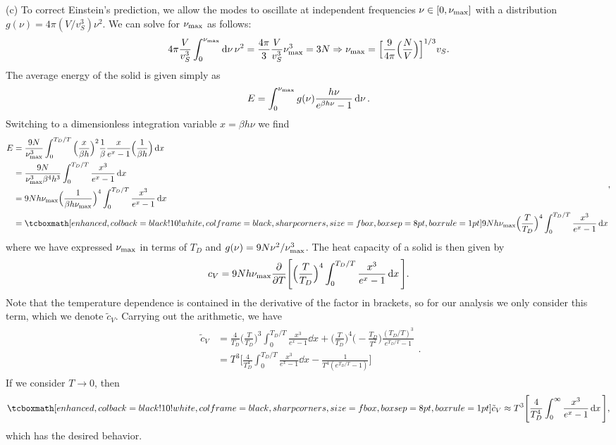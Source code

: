 {(c) To correct Einstein's prediction, we allow the modes to oscillate at independent frequencies $\nu \in [0,\nu_{\rm max}]$ with a distribution $g(\nu) = 4 \pi (V/v_{S}^3) \nu^2$.
We can solve for $\nu_{\rm max}$ as follows:
\begin{eqnarray}
    4 \pi \frac{V}{v_{S}^3} \int_{0}^{\nu_{\rm max}} \dd{\nu} \nu^2 = \frac{4 \pi}{3} \frac{V}{v_{S}^3} \nu_{\rm max}^3 = 3 N \Rightarrow \nu_{\rm max} = \Big[ \frac{9}{4 \pi} \Big( \frac{N}{V} \Big) \Big]^{1/3} v_{S}
.\end{eqnarray}
The average energy of the solid is given simply as 
\begin{eqnarray}
    E = \int_{0}^{\nu_{\rm max}} g(\nu) \frac{h \nu}{e^{\beta h \nu} - 1} \dd{\nu}
.\end{eqnarray}
Switching to a dimensionless integration variable $x = \beta h \nu$ we find
\begin{eqnarray}
    \begin{aligned}
        E &= \frac{9 N}{\nu_{\rm max}^3} \int_{0}^{T_{D}/T} \Big( \frac{x}{\beta h} \Big)^2 \frac{1}{\beta} \frac{x}{e^{x} - 1} \Big( \frac{1}{\beta h} \Big) \dd{x} \\
          &= \frac{9 N}{\nu_{\rm max}^3 \beta^{4} h^3} \int_{0}^{T_{D}/T} \frac{x^3}{e^{x}-1} \dd{x} \\
          &= 9 N h \nu_{\rm max} \Big( \frac{1}{\beta h \nu_{\rm max}} \Big)^{4} \int_{0}^{T_{D}/T} \frac{x^3}{e^{x} - 1} \dd{x} \\
          &= \eqbox{9 N h \nu_{\rm max} \Big( \frac{T}{T_{D}} \Big)^{4} \int_{0}^{T_{D}/T} \frac{x^3}{e^{x} - 1} \dd{x} }
    \end{aligned}
,\end{eqnarray}
where we have expressed $\nu_{\rm max}$ in terms of $T_{D}$ and $g(\nu) = 9 N \nu^2 / \nu_{\rm max}^3$.
The heat capacity of a solid is then given by
\begin{eqnarray}
    c_{V} = 9 N h \nu_{\rm max} \pdv{T} \Bigg[ \Big( \frac{T}{T_{D}} \Big)^{4} \int_{0}^{T_{D}/T}\frac{x^3}{e^{x} - 1} \dd{x} \Bigg]
.\end{eqnarray}
Note that the temperature dependence is contained in the derivative of the factor in brackets, so for our analysis we only consider this term, which we denote $\tilde{c}_{V}$.
Carrying out the arithmetic, we have 
\begin{eqnarray}
   \begin{aligned}
       \tilde{c}_{V} &= \frac{4}{T_{D}} \Big( \frac{T}{T_{D}} \Big)^{3} \int_{0}^{T_{D}/T} \frac{x^3}{e^{x} - 1} \dd{x} + \Big( \frac{T}{T_{D}} \Big)^{4} \Big( -\frac{T_{D}}{T^2} \Big) \frac{(T_{D}/T)^3}{e^{T_{D}/T} - 1} \\
                     &= T^3 \Bigg[ \frac{4}{T_{D}^{4}} \int_{0}^{T_{D}/T} \frac{x^{3}}{e^{x} - 1} \dd{x} - \frac{1}{T^{4}(e^{T_{D}/T} - 1)} \Bigg]
   \end{aligned} 
.\end{eqnarray}
If we consider $T \rightarrow 0$, then
\begin{eqnarray}
    \eqbox{ \tilde{c}_{V} \approx T^3 \Bigg[ \frac{4}{T_{D}^{4}} \int_{0}^{\infty} \frac{x^3}{e^{x} - 1} \dd{x} \Bigg] }
,\end{eqnarray}
which has the desired behavior.

}

